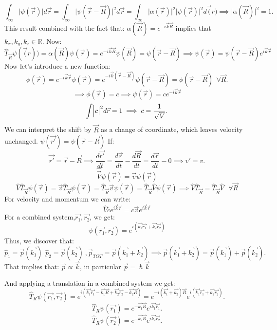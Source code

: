 \documentclass{article}
\begin{document}
$$ \int_{\infty} \bigl| \psi(\vec{r}) \bigl| d\vec{r} = \int_{\infty} \bigl| \psi(\vec{r}-\vec{R}) \bigl|^2 d\vec{r} = \int_{\infty} \bigl| \alpha(\vec{r}) \bigl| ^2 \bigl| \psi(\vec{r}) \bigl|^2 d\vec(r) \implies \bigl| \alpha(\vec{R}) \bigl|^2 = 1. $$
This result combined with the fact that: $ \alpha(\vec{R}) = e^{-i \vec{k} \vec{R}} $ implies that $k_x,k_y,k_z \in \mathbb{R}.$
Now:
$$ \hat{T}_{\vec{R}} \psi(\vec(r)) = \alpha(\vec{R}) \psi(\vec{r}) = e^{-i \vec{k} \vec{R}} \psi(\vec{R}) = \psi(\vec{r}-\vec{R}) \implies \psi(\vec{r}) = \psi(\vec{r}-\vec{R}) e^{i \vec{k} \vec{r}} $$
Now let's introduce a new function:
$$\phi(\vec{r}) = e^{-i \vec{k} \vec{r}} \psi(\vec{r}) = e^{-i \vec{k}(\vec{r}-\vec{R})} \psi(\vec{r}-\vec{R}) = \phi(\vec{r}-\vec{R}) \ \ \forall \vec{R}.$$
$$\implies \phi(\vec{r}) = c \implies \psi(\vec{r}) = c e^{-i\vec{k}\vec{r}}$$
$$\int \Bigl|c\bigl|^2 d\vec{r} =1 \implies c = \frac{1}{\sqrt{V}}.$$
We can interpret the shift by $\vec{R}$ as a change of coordinate, which leaves velocity unchanged.
$\psi(\vec{r'}) = \psi(\vec{r}-\vec{R})$
If:
$$ \vec{r'} = \vec{r} -\vec{R} \implies \frac{d\vec{r'}}{dt} = \frac{d\vec{r}}{dt} - \frac{d\vec{R}}{dt}  = \frac{d\vec{r}}{dt} - 0 \implies v' = v.$$
$$\hat{\vec{V}}\psi(\vec{r}) = \vec{v}\psi(\vec{r})$$
$$\hat{V}\hat{T}_{\vec{R}}\psi(\vec{r}) = \vec{v}\hat{T}_{\vec{R}}\psi(\vec{r}) = \hat{T}_{\vec{R}}\vec{v} \psi(\vec{r}) = \hat{T}_{\vec{R}}\hat{V}\psi(\vec{r}) \implies \hat{V}\hat{T}_{\vec{R}} =   \hat{T}_{\vec{R}}\hat{V}  \ \ \ \forall \vec{R} $$
For velocity and momentum we can write:
$$ \hat{V} ce^{i\vec{k}\vec{r}}=c\vec{v}e^{i\vec{k}\vec{r}}$$
For a combined system,$\vec{r_1},\vec{r_2}$, we get:
$$\psi(\vec{r_1},\vec{r_2}) = e^{i(\vec{k_1}\vec{r_1}+\vec{k_2}\vec{r_2})}$$
Thus, we discover that:
$$\hat{p}_1 = \vec{p}(\vec{k_1}) \, \ \hat{p}_2 = \vec{p}(\vec{k_2}) \ , \vec{p}_{TOT} = \vec{p}(\vec{k_1}+\vec{k_2}) \implies \vec{p}(\vec{k_1}+\vec{k_2}) = \vec{p}(\vec{k_1}) + \vec{p}(\vec{k_2}). $$ 
That implies that: $\vec{p} \varpropto \vec{k}$, in particular $\vec{p} = \hslash \vec{k}$ 

And applying a translation in a combined system we get:
$$\hat{T}_{R}\psi(\vec{r_1},\vec{r_2}) = e^{i(\vec{k_1}\vec{r_1}-\vec{k_1}\vec{R}+\vec{k_2}\vec{r_2}-\vec{k_2}\vec{R})} = e^{-i(\vec{k_1}+\vec{k_2})\vec{R}} e^{i(\vec{k_1}\vec{r_1}+\vec{k_2}\vec{r_2})}.$$
$$\hat{T}_{R} \psi(\vec{r_1}) = e^{-\vec{k_1}\vec{R}}e^{i\vec{k_1}\vec{r_1}}.$$
$$\hat{T}_{R} \psi(\vec{r_2}) = e^{-\vec{k_2}\vec{R}}e^{i\vec{k_2}\vec{r_2}}.$$
\end{document}
